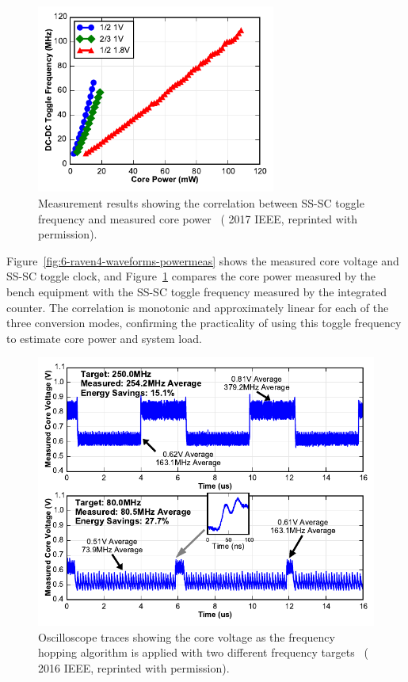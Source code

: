 \documentclass[graybox]{svmult}
\begin{document}
\begin{figure}
  \centering
  \includegraphics[width=0.7\textwidth]{6-raven4-powermeas}
  \caption{Measurement results showing the correlation between SS-SC toggle frequency and measured core power~\cite{Keller2017} ({\textcopyright} 2017 IEEE, reprinted with permission).}
  \label{fig:6-raven4-powermeas}
\end{figure}

Figure~\ref{fig:6-raven4-waveforms-powermeas} shows the measured core voltage and SS-SC toggle clock, and Figure~\ref{fig:6-raven4-powermeas} compares the core power measured by the bench equipment with the SS-SC toggle frequency measured by the integrated counter.
The correlation is monotonic and approximately linear for each of the three conversion modes, confirming the practicality of using this toggle frequency to estimate core power and system load.

\begin{figure}
  \centering
  \includegraphics[width=\textwidth]{6-raven4-freqhopping}
  \caption{Oscilloscope traces showing the core voltage as the frequency hopping algorithm is applied with two different frequency targets~\cite{Keller2016} ({\textcopyright} 2016 IEEE, reprinted with permission).}
  \label{fig:6-raven4-freqhopping}
\end{figure}
\end{document}
